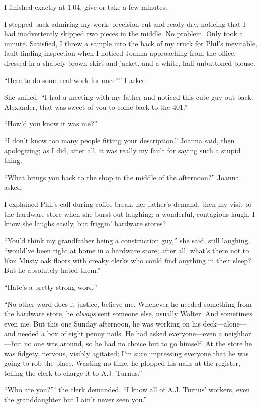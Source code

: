 I finished exactly at 1:04, give or take a few minutes.

I stepped back admiring my work: precision-cut and ready-dry, noticing
that I had inadvertently skipped two pieces in the middle. No problem.
Only took a minute. Satisfied, I threw a sample into the back of my
truck for Phil's inevitable, fault-finding inspection when I noticed
Joanna approaching from the office, dressed in a shapely brown skirt and
jacket, and a white, half-unbuttoned blouse.

``Here to do some real work for once?'' I asked.

She smiled. ``I had a meeting with my father and noticed this cute guy
out back. Alexander, that was sweet of you to come back to the 401.''

``How'd you know it was me?''

``I don't know too many people fitting your description.'' Joanna said,
then apologizing; as I did, after all, it was really my fault for saying
such a stupid thing.

``What brings you back to the shop in the middle of the afternoon?''
Joanna asked.

I explained Phil's call during coffee break, her father's demand, then
my visit to the hardware store when she burst out laughing; a wonderful,
contagious laugh. I know she laughs easily, but friggin' hardware
stores?

``You'd think my grandfather being a construction guy,'' she said, still
laughing, ``would've been right at home in a hardware store; after all,
what's there not to like: Musty oak floors with creaky clerks who could
find anything in their sleep? But he absolutely hated them.''

``Hate's a pretty strong word.''

``No other word does it justice, believe me. Whenever he needed
something from the hardware store, he \emph{always} sent someone else,
usually Walter. And sometimes even me. But this one Sunday afternoon, he
was working on his deck---alone---and needed a box of eight penny nails.
He had asked everyone---even a neighbor---but no one was around, so he
had no choice but to go himself. At the store he was fidgety, nervous,
visibly agitated; I'm sure impressing everyone that he was going to rob
the place. Wasting no time, he plopped his nails at the register,
telling the clerk to charge it to A.J. Turnus.''

``Who are you?''' the clerk demanded. ``I know all of A.J. Turnus'
workers, even the granddaughter but I ain't never seen you.''

